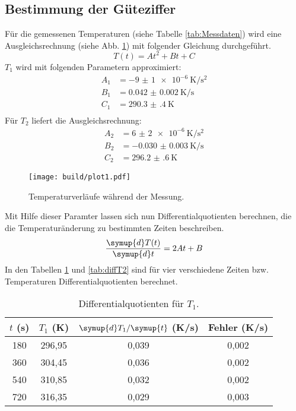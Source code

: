 \subsection{Bestimmung der Güteziffer}
\label{sec:Auswertung_Gueteziffer}

Für die gemessenen Temperaturen (siehe Tabelle \ref{tab:Messdaten}) wird eine Ausgleichsrechnung (siehe Abb. \ref{fig:plot1}) mit folgender Gleichung durchgeführt.
\begin{equation*}
  T(t) = At^2 + Bt + C
\end{equation*}
$T_1$ wird mit folgenden Parametern approximiert:
\begin{align*}
  A_1 &= \SI{-9(1)e-6}{\kelvin\per\second\squared} \\
  B_1 &= \SI{0.042(2)}{\kelvin\per\second} \\
  C_1 &= \SI{290.3(4)}{\kelvin} \\
\end{align*}
Für $T_2$ liefert die Ausgleichsrechnung:
\begin{align*}
  A_2 &= \SI{6(2)e-6}{\kelvin\per\second\squared} \\
  B_2 &= \SI{-0.030(3)}{\kelvin\per\second} \\
  C_2 &= \SI{296.2(6)}{\kelvin}
\end{align*}
\begin{figure}
  \centering
  \texttt{[image: build/plot1.pdf]}
  \caption{Temperaturverläufe während der Messung.}
  \label{fig:plot1}
\end{figure}
Mit Hilfe dieser Paramter lassen sich nun Differentialquotienten berechnen, die die Temperaturänderung zu bestimmten Zeiten beschreiben.
\begin{equation*}
  \frac{\symup{d}T(t)}{\symup{d}t} = 2At + B
\end{equation*}
In den Tabellen \ref{tab:diffT1} und \ref{tab:diffT2} sind für vier verschiedene Zeiten bzw. Temperaturen Differentialquotienten berechnet.
\begin{table}
  \centering
  \caption{Differentialquotienten für $T_1$.}
  \label{tab:diffT1}
  \begin{tabular}{c c c c}
    \toprule
    $t$ (s) & $T_1$ (K) & $\symup{d}T_1/\symup{t}$ (K/s) & Fehler (K/s) \\
    \midrule
    180 & 296,95 & 0,039 & 0,002 \\
    360 & 304,45 & 0,036 & 0,002 \\
    540 & 310,85 & 0,032 & 0,002 \\
    720 & 316,35 & 0,029 & 0,003 \\
    \bottomrule
  \end{tabular}
\end{table}
